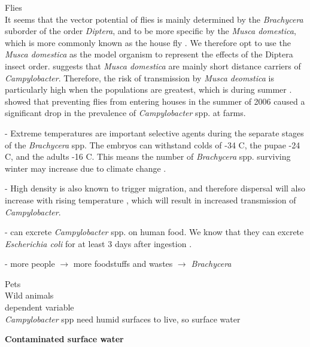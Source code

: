 \textcolor{AMAZINGPINK}{Flies} \\
It seems that the vector potential of flies is mainly determined by the \textit{Brachycera} suborder of the order \textit{Diptera}, and to be more specific by the \textit{Musca domestica}, which is more commonly known as the house fly \parencite{hald_influxed_2008}. We therefore opt to use the \textit{Musca domestica} as the model organism to represent the effects of the Diptera insect order. \cite{skovgard_retention_2011} suggests that \textit{Musca domestica} are mainly short distance carriers of \textit{Campylobacter}. Therefore, the risk of transmission by \textit{Musca deomstica} is particularly high when the populations are greatest, which is during summer \parencite{royden_role_2016}. \cite{hald_use_2007} showed that preventing flies from entering houses in the summer of 2006 caused a significant drop in the prevalence of \textit{Campylobacter} spp. at farms.


- Extreme temperatures are important selective agents during the separate stages of the \textit{Brachycera} spp. The embryos can withstand colds of -34 \degree C, the pupae -24 \degree C, and the adults -16 \degree C.  This means the number of \textit{Brachycera} spp. surviving winter may increase due to climate change \parencite{goulson_predicting_2005}.

- High density is also known to trigger migration, and therefore dispersal will also increase with rising temperature \parencite{feder_locomotion_2010}, which will result in increased transmission of \textit{Campylobacter}.

-  can excrete \textit{Campylobacter} spp. on human food. We know that they can excrete \textit{Escherichia coli} for at least 3 days after ingestion \parencite{sasaki_epidemiological_2000}.

- more people $\to$ more foodstuffs and wastes $\to$ \textit{Brachycera} \parencite{imai_population_1984}

\textcolor{AMAZINGPINK}{Pets} \\

\textcolor{AMAZINGPINK}{Wild animals} \\

\textcolor{AMAZINGPINK}{dependent variable} \\
\textit{Campylobacter} spp need humid surfaces to live, so surface water %


\textbf{Contaminated surface water}

